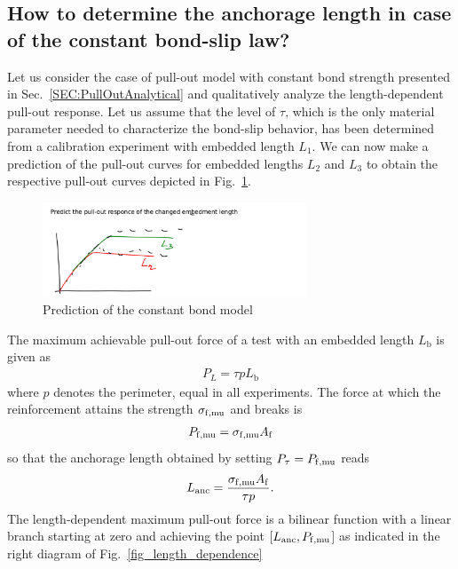 \documentclass[main.tex]{subfiles}
\begin{document}
\subsection{How to determine the anchorage length in case of the constant bond-slip law?}
Let us consider the case of pull-out model with constant bond strength presented in Sec.~\ref{SEC:PullOutAnalytical} and qualitatively analyze the length-dependent pull-out response. Let us assume that the level of $\tau$, which is the only material parameter needed to characterize the bond-slip behavior, has been determined from a calibration experiment with embedded length $L_1$.
We can now make a prediction of the pull-out curves for embedded lengths $L_2$ and $L_3$ to obtain the respective pull-out curves depicted in Fig.~\ref{FIGPredictionConstantBond}. 
%
\begin{figure}[ht]
	\centering
  \includegraphics[width=0.7\textwidth]{drawings/prediction_constant_bond.pdf}
	\caption{Prediction of the constant bond model}
	\label{FIGPredictionConstantBond}
\end{figure}

The maximum achievable pull-out force of a test with an embedded length $L_\mathrm{b}$ is given as  
\begin{align}
\label{EQ:MaxEmbeddedLength}
P_{L} = \tau p L_\mathrm{b}
\end{align}
where $p$ denotes the perimeter, equal in all experiments. The force at  which the reinforcement attains the strength $\sigma_{\mathrm{f},\mathrm{mu}}$ and breaks is
\begin{align}
P_{\mathrm{f},\mathrm{mu}}  = \sigma_{\mathrm{f},\mathrm{mu}} A_{\mathrm{f}}
\end{align}
so that the anchorage length obtained by setting $P_\tau = P_{\mathrm{f},\mathrm{mu}}$ reads 
\begin{align}
\label{EQ:ConstantBondAnchorageLength}
L_{\mathrm{anc}} = \frac{\sigma_{\mathrm{f},\mathrm{mu}} A_{\mathrm{f}} }
{\tau p}.
\end{align}
The length-dependent maximum pull-out force is a bilinear function with a linear branch starting at zero and achieving the point
$[L_\mathrm{anc}, P_{\mathrm{f},\mathrm{mu}}$] as indicated in the right diagram of Fig.~\ref{fig_length_dependence}
\end{document}
